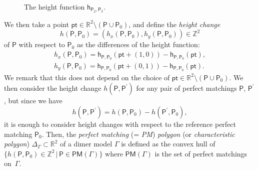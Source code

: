 \documentclass[11pt]{article}
\numberwithin{equation}{section}
\numberwithin{equation}{section}
\numberwithin{figure}{section}
\numberwithin{table}{section}
\newcommand{\ZZ}{\mathbb{Z}}
\newcommand{\RR}{\mathbb{R}}
\newcommand{\pt}{\mathsf{pt}}
\newcommand{\sfh}{\mathsf{h}}
\newcommand{\sfP}{\mathsf{P}}
\newcommand{\PM}{\mathsf{PM}}
\begin{document}
\begin{figure}[h!]
{
}
\caption{The height function $\sfh_{\sfP_2,\sfP_3}$.}\label{fig_heightchnge}
\end{figure}

We then take a point $\pt\in\RR^2{\setminus}(\sfP\cup\sfP_0)$, and define the \emph{height change}
\begin{displaymath}
h(\sfP,\sfP_0)=(h_x(\sfP,\sfP_0),h_y(\sfP,\sfP_0))\in\ZZ^2
\end{displaymath}
of $\sfP$ with respect to $\sfP_0$ as the differences of the height function:
\begin{gather*}
h_x(\sfP,\sfP_0)=\sfh_{\sfP,\sfP_0}(\pt+(1,0))-\sfh_{\sfP,\sfP_0}(\pt),
\\
h_y(\sfP,\sfP_0)=\sfh_{\sfP,\sfP_0}(\pt+(0,1))-\sfh_{\sfP,\sfP_0}(\pt).
\end{gather*}
We remark that this does not depend on the choice of $\pt\in\RR^2{\setminus}(\sfP\cup\sfP_0)$.
We then consider the height change $h(\sfP,\sfP^\prime)$ for any pair of perfect matchings $\sfP$, $\sfP^\prime$,
but since we have
\begin{equation*}%
h(\sfP,\sfP^\prime)=h(\sfP,\sfP_0)-h(\sfP^\prime,\sfP_0),
\end{equation*}
it is enough to consider height changes with respect to the reference perfect matching $\sfP_0$.
Then, the \emph{perfect matching} (= \emph{PM}) \emph{polygon} (or \emph{characteristic polygon}) $\Delta_\Gamma\subset\RR^2$ of a dimer model $\Gamma$ is defined
as the convex hull of $\big\{h(\sfP,\sfP_0)\in\ZZ^2\,|\, \sfP\in\PM(\Gamma)\big\}$ where $\PM(\Gamma)$ is the set of perfect matchings on~$\Gamma$.
\end{document}
